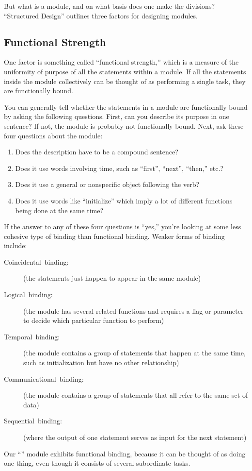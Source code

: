 But what is a module, and on what basis does one make the divisions?
``Structured Design'' outlines three factors for designing modules.


\subsection{Functional Strength}%
%
One factor is something called ``functional strength,'' which is a
measure of the uniformity of purpose of all the statements within a
module. If all the statements inside the module collectively can be
thought of as performing a single task, they are functionally bound.

You can generally tell whether the statements in a module are
functionally bound by asking the following questions. First, can you
describe its purpose in one sentence? If not, the module is probably
not functionally bound. Next, ask these four questions about the
module:
\begin{enumerate}
\item Does the description have to be a compound sentence?
\item Does it use words involving time, such as ``first'', ``next'',
``then,'' etc.?
\item Does it use a general or nonspecific object following the verb?
\item Does it use words like ``initialize'' which imply a lot of
different functions being done at the same time?
\end{enumerate}
If the answer to any of these four questions is ``yes,'' you're
looking at some less cohesive type of binding than functional binding.
Weaker forms of binding include:

\begin{description}
\item [Coincidental~binding:]
(the statements just happen to appear in the same module)
\item [Logical~binding:]
(the module has several related functions and requires a flag or
parameter to decide which particular function to perform)
\item [Temporal~binding:]
(the module contains a group of statements that happen at the same
time, such as initialization but have no other relationship)
\item [Communicational~binding:]
(the module contains a group of statements that all refer
to the same set of data)
\item [Sequential~binding:]
(where the output of one statement serves as input for the next statement)
\end{description}
Our ``'' module exhibits functional binding, because
it can be thought of as doing one thing, even though it consists of
several subordinate tasks.%
%


